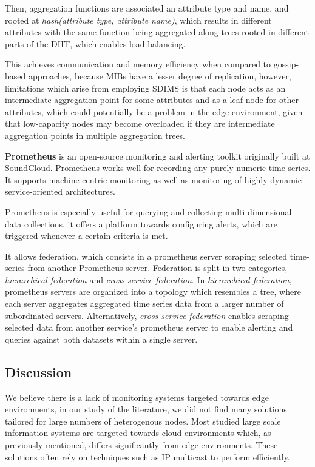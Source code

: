 Then, aggregation functions are associated an attribute type and name, and rooted at \textit{hash(attribute type, attribute name)}, which results in different attributes with the same function being aggregated along trees rooted in different parts of the DHT, which enables load-balancing.

This achieves communication and memory efficiency when compared to gossip-based approaches, because MIBs have a lesser degree of replication, however, limitations which arise from employing SDIMS is that each node acts as an intermediate aggregation point for some attributes and as a leaf node for other attributes, which could potentially be a problem in the edge environment, given that low-capacity nodes may become overloaded if they are intermediate aggregation points in multiple aggregation trees. 

\textbf{Prometheus} \cite{prometheus} is an open-source monitoring and alerting toolkit originally built at SoundCloud. Prometheus works well for recording any purely numeric time series. It supports machine-centric monitoring as well as monitoring of highly dynamic service-oriented architectures. 

Prometheus is especially useful for querying and collecting multi-dimensional data collections, it offers a platform towards configuring alerts, which are triggered whenever a certain criteria is met. 

It allows federation, which consists in a prometheus server scraping selected time-series from another Prometheus server. Federation is split in two categories, \textit{hierarchical federation} and \textit{cross-service federation}. In \textit{hierarchical federation}, prometheus servers are organized into a topology which resembles a tree, where each server aggregates aggregated time series data from a larger number of subordinated servers. Alternatively,  \textit{cross-service federation} enables scraping selected data from another service's prometheus server to enable alerting and queries against both datasets within a single server. 

\subsection{Discussion}

We believe there is a lack of monitoring systems targeted towards edge environments, in our study of the literature, we did not find many solutions tailored for large numbers of heterogenous nodes. Most studied large scale information systems are targeted towards cloud environments which, as previously mentioned, differs significantly from edge environments. These solutions often rely on techniques such as IP multicast \cite{massie2004ganglia} to perform efficiently.

